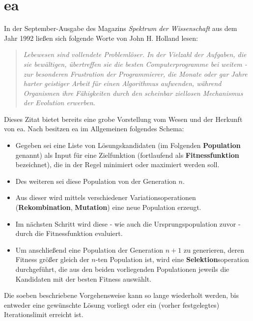 	\section{\gls{ea}}
	\label{sec:evol}
		
		In der September-Ausgabe des Magazins \textit{Spektrum der Wissenschaft} \cite{j-h-holland} aus dem Jahr 1992 ließen sich folgende Worte von John H. Holland lesen: \\
		
		\begin{quote}
			\textit{Lebewesen sind vollendete Problemlöser. In der Vielzahl der Aufgaben, die sie bewältigen, übertreffen sie die besten Computerprogramme bei weitem - zur besonderen Frustration der Programmierer, die Monate oder gar Jahre harter geistiger Arbeit für einen Algorithmus aufwenden, während Organismen ihre Fähigkeiten durch den scheinbar ziellosen Mechanismus der Evolution erwerben.}
		\end{quote}
		
		Dieses Zitat bietet bereits eine grobe Vorstellung vom Wesen und der Herkunft von \gls{ea}. Nach \cite{eib-smi-ea} besitzen \gls{ea} im Allgemeinen folgendes Schema: \\
		\begin{itemize}
			\item Gegeben sei eine Liste von Lösungskandidaten (im Folgenden \textbf{Population} genannt) als Input für eine Zielfunktion (fortlaufend als \textbf{Fitnessfunktion} bezeichnet), die in der Regel minimiert oder maximiert werden soll.
			\item Des weiteren sei diese Population von der Generation $n$.
			\item Aus dieser wird mittels verschiedener Variationsoperationen (\textbf{Rekombination}, \textbf{Mutation}) eine neue Population  erzeugt.
			\item Im nächsten Schritt wird diese - wie auch die Ursprungspopulation zuvor - durch die Fitnessfunktion evaluiert.
			\item Um anschließend eine Population der Generation $n+1$ zu generieren, deren Fitness größer gleich der $n$-ten Population ist, wird eine \textbf{Selektion}soperation durchgeführt, die aus den beiden vorliegenden Populationen jeweils die Kandidaten mit der besten Fitness auswählt.
		\end{itemize}
		
		Die soeben beschriebene Vorgehensweise kann so lange wiederholt werden, bis entweder eine gewünschte Lösung vorliegt oder ein (vorher festgelegtes) Iterationslimit erreicht ist. \\
		
